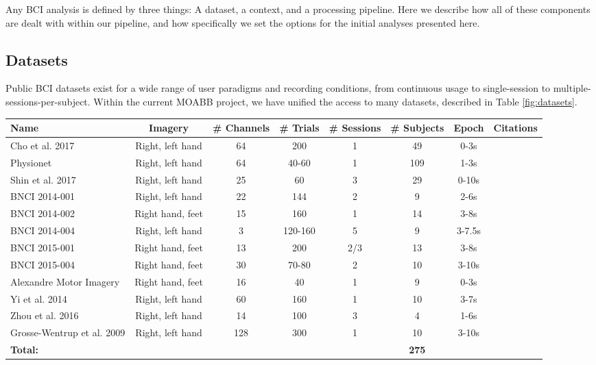 Any BCI analysis is defined by three things: A dataset, a context, and
a processing pipeline. Here we describe how all of these components
are dealt with within our pipeline, and how specifically we set the
options for the initial analyses presented here.

\subsection{Datasets}

Public BCI datasets exist for a wide range of user paradigms and
recording conditions, from continuous usage to single-session to
multiple-sessions-per-subject. Within the current MOABB project, we
have unified the access to many datasets, described in Table
\ref{fig:datasets}.


\begin{table*}[ht]
  \centering
  \begin{tabular}{l || c | c | c | c | c | c | c }
    Name & Imagery & \# Channels & \# Trials & \# Sessions & \# Subjects & Epoch & Citations \\ \hline
    Cho et al. 2017 & Right, left hand & 64 & 200 & 1 & 49 & 0-3s & \cite{Cho2017} \\
    Physionet & Right, left hand & 64 & 40-60 & 1 & 109 & 1-3s & \cite{Schalk2004, Goldberger2000} \\
    Shin et al. 2017 & Right, left hand & 25 & 60 & 3 & 29 & 0-10s & \cite{Blankertz2007, Shin2017} \\
    BNCI 2014-001 & Right, left hand & 22 & 144 & 2 & 9 & 2-6s & \cite{Tangermann2012} \\
    BNCI 2014-002 & Right hand, feet & 15 & 160 & 1 & 14 & 3-8s & \cite{Steyrl2016} \\
    BNCI 2014-004 & Right, left hand & 3 & 120-160 & 5 & 9 & 3-7.5s & \cite{Leeb2007} \\
    BNCI 2015-001 & Right hand, feet & 13 & 200 & 2/3 & 13 & 3-8s & \cite{Faller2012} \\
    BNCI 2015-004 & Right hand, feet & 30 & 70-80 & 2 & 10 & 3-10s & \cite{Scherer2015a} \\
    Alexandre Motor Imagery & Right hand, feet & 16 & 40 & 1 & 9 & 0-3s & \cite{Barachant2012a}\\
    Yi et al. 2014 & Right, left hand & 60 & 160 & 1 & 10 & 3-7s & \cite{Yi2014} \\
    Zhou et al. 2016 & Right, left hand & 14 & 100 & 3 & 4 & 1-6s & \cite{Zhou2016}\\
    Grosse-Wentrup et al. 2009 & Right, left hand & 128 & 300 & 1 & 10 & 3-10s & \cite{Grosse-Wentrup2009} \\
    \hline
    \centering\bf{Total}: & & & & & \bf{275}& &
    
\end{tabular}
    \caption{Dataset attributes}
    \label{fig:datasets}
\end{table*}

